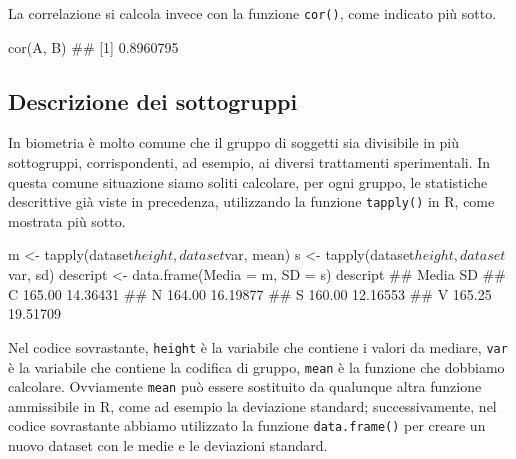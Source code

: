 \documentclass[a4paper,12pt,oneside]{book}
\newenvironment{Shaded}{\begin{snugshade}}{\end{snugshade}}
\newcommand{\SpecialCharTok}[1]{#1}
\newcommand{\DocumentationTok}[1]{#1}
\newcommand{\OtherTok}[1]{#1}
\newcommand{\FunctionTok}[1]{#1}
\newcommand{\AttributeTok}[1]{#1}
\newcommand{\NormalTok}[1]{#1}
\begin{document}
La correlazione si calcola invece con la funzione \texttt{cor()}, come indicato più sotto.

\begin{Shaded}
\begin{Highlighting}[]
\FunctionTok{cor}\NormalTok{(A, B)}
\DocumentationTok{\#\# [1] 0.8960795}
\end{Highlighting}
\end{Shaded}

\hypertarget{descrizione-dei-sottogruppi}{%
\subsection{Descrizione dei sottogruppi}\label{descrizione-dei-sottogruppi}}

In biometria è molto comune che il gruppo di soggetti sia divisibile in più sottogruppi, corrispondenti, ad esempio, ai diversi trattamenti sperimentali. In questa comune situazione siamo soliti calcolare, per ogni gruppo, le statistiche descrittive già viste in precedenza, utilizzando la funzione \texttt{tapply()} in R, come mostrata più sotto.

\begin{Shaded}
\begin{Highlighting}[]
\NormalTok{m }\OtherTok{\textless{}{-}} \FunctionTok{tapply}\NormalTok{(dataset}\SpecialCharTok{$}\NormalTok{height, dataset}\SpecialCharTok{$}\NormalTok{var, mean)}
\NormalTok{s }\OtherTok{\textless{}{-}} \FunctionTok{tapply}\NormalTok{(dataset}\SpecialCharTok{$}\NormalTok{height, dataset}\SpecialCharTok{$}\NormalTok{var, sd)}
\NormalTok{descript }\OtherTok{\textless{}{-}} \FunctionTok{data.frame}\NormalTok{(}\AttributeTok{Media =}\NormalTok{ m, }\AttributeTok{SD =}\NormalTok{ s)}
\NormalTok{descript}
\DocumentationTok{\#\#    Media       SD}
\DocumentationTok{\#\# C 165.00 14.36431}
\DocumentationTok{\#\# N 164.00 16.19877}
\DocumentationTok{\#\# S 160.00 12.16553}
\DocumentationTok{\#\# V 165.25 19.51709}
\end{Highlighting}
\end{Shaded}

Nel codice sovrastante, \texttt{height} è la variabile che contiene i valori da mediare, \texttt{var} è la variabile che contiene la codifica di gruppo, \texttt{mean} è la funzione che dobbiamo calcolare. Ovviamente \texttt{mean} può essere sostituito da qualunque altra funzione ammissibile in R, come ad esempio la deviazione standard; successivamente, nel codice sovrastante abbiamo utilizzato la funzione \texttt{data.frame()} per creare un nuovo dataset con le medie e le deviazioni standard.
\end{document}
